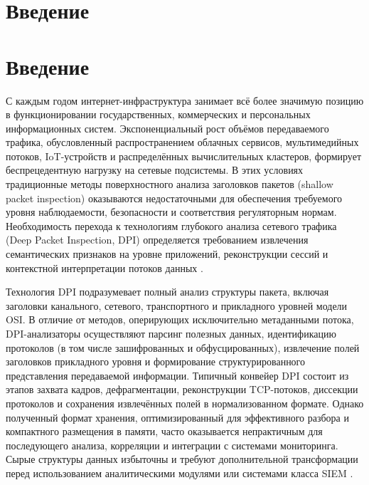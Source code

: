 \section{Введение}
\label{sec:Section0} 

\section*{Введение}
С каждым годом интернет-инфраструктура занимает всё более значимую позицию в функционировании государственных, коммерческих и персональных информационных систем.
Экспоненциальный рост объёмов передаваемого трафика, обусловленный распространением облачных сервисов, мультимедийных потоков, IoT-устройств и распределённых вычислительных кластеров, формирует беспрецедентную нагрузку на сетевые подсистемы.
В этих условиях традиционные методы поверхностного анализа заголовков пакетов (shallow packet inspection) оказываются недостаточными для обеспечения требуемого уровня наблюдаемости, безопасности и соответствия регуляторным нормам.
Необходимость перехода к технологиям глубокого анализа сетевого трафика (Deep Packet Inspection, DPI) определяется требованием извлечения семантических признаков на уровне приложений, реконструкции сессий и контекстной интерпретации потоков данных \cite{zhang2021nta}.

Технология DPI подразумевает полный анализ структуры пакета, включая заголовки канального, сетевого, транспортного и прикладного уровней модели OSI.
В отличие от методов, оперирующих исключительно метаданными потока, DPI-анализаторы осуществляют парсинг полезных данных, идентификацию протоколов (в том числе зашифрованных и обфусцированных), извлечение полей заголовков прикладного уровня и формирование структурированного представления передаваемой информации.
Типичный конвейер DPI состоит из этапов захвата кадров, дефрагментации, реконструкции TCP-потоков, диссекции протоколов и сохранения извлечённых полей в нормализованном формате.
Однако полученный формат хранения, оптимизированный для эффективного разбора и компактного размещения в памяти, часто оказывается непрактичным для последующего анализа, корреляции и интеграции с системами мониторинга.
Сырые структуры данных избыточны и требуют дополнительной трансформации перед использованием аналитическими модулями или системами класса SIEM \cite{pang2020dpi}.

